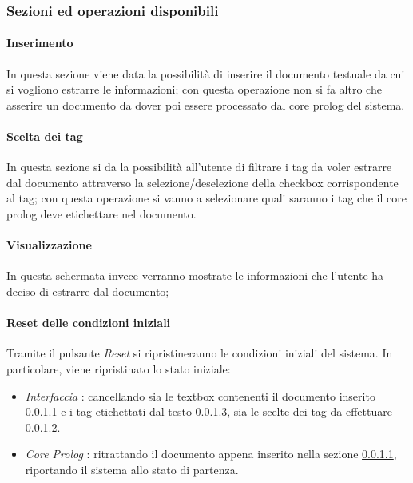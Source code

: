 \subsubsection{Sezioni ed operazioni disponibili}
    \paragraph{Inserimento}
    \label{Inserimento}
    In questa sezione viene data la possibilità di inserire il documento testuale da cui si vogliono estrarre le informazioni; con questa operazione non si fa altro che asserire un documento da dover poi essere processato dal core prolog del sistema.
    \paragraph{Scelta dei tag}
    \label{ChoiceTag}
    In questa sezione si da la possibilità all'utente di filtrare i tag da voler estrarre dal documento attraverso la selezione/deselezione della checkbox corrispondente al tag; con questa operazione si vanno a selezionare quali saranno i tag che il core prolog deve etichettare nel documento.
    \paragraph{Visualizzazione}
    \label{Visualization}
    In questa schermata invece verranno mostrate le informazioni che l'utente ha deciso di estrarre dal documento;
    \paragraph{Reset delle condizioni iniziali}
    Tramite il pulsante \emph{Reset} si ripristineranno le condizioni iniziali del sistema. In particolare, viene ripristinato lo stato iniziale:
    \begin{itemize}
      \item \emph{Interfaccia} : cancellando sia le textbox contenenti il documento inserito \ref{Inserimento} e i tag etichettati dal testo \ref{Visualization}, sia le scelte dei tag da effettuare \ref{ChoiceTag}.
      \item \emph{Core Prolog} : ritrattando il documento appena inserito nella sezione \ref{Inserimento}, riportando il sistema allo stato di partenza.
    \end{itemize}
